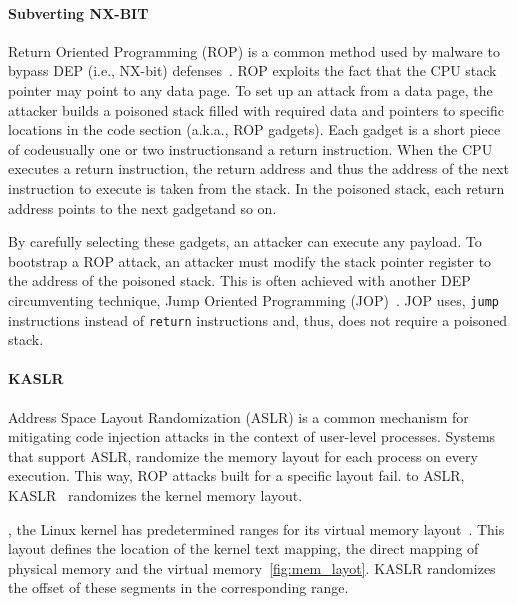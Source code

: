 \paragraph{Subverting NX-BIT}

Return Oriented Programming (ROP) is a common method used by malware to bypass DEP (i.e., NX-bit) defenses~\cite{RBSS12}. ROP exploits the fact that the CPU stack pointer may point to any data page. To set up an attack from a data page, the attacker builds a poisoned stack filled with required data and pointers to specific locations in the code section (a.k.a., ROP gadgets). Each gadget is a short piece of code\DIFdelbegin \DIFdel{(}\DIFdelend \DIFaddbegin \DIFadd{, }\DIFaddend usually one or two instructions\DIFdelbegin \DIFdel{) }\DIFdelend \DIFaddbegin \DIFadd{, }\DIFaddend and a return instruction. When the CPU executes a return instruction, the return address and thus the address of the next instruction to execute is taken from the stack. In the poisoned stack, each return address points to the next gadget\DIFaddbegin \DIFadd{, }\DIFaddend and so on. 

By carefully selecting these gadgets, an attacker can execute any payload. To bootstrap a ROP attack, an attacker must modify the stack pointer register to the address of the poisoned stack. This is often achieved with another DEP circumventing technique, \DIFdelbegin {}\DIFdelend \DIFaddbegin {}\DIFaddend Jump Oriented Programming (JOP)~\cite{BJFL11}. JOP uses, \texttt{jump} instructions instead of \texttt{return} instructions and, thus, does not require a poisoned stack.

\paragraph{KASLR}\label{sec:kaslr}

Address Space Layout Randomization (ASLR) is a common mechanism for mitigating code injection attacks in the context of user-level processes. Systems that support ASLR, randomize the memory layout for each process on every execution. This way, ROP attacks built for a specific layout fail. \DIFdelbegin {}\DIFdelend \DIFaddbegin {}\DIFaddend to ASLR, KASLR~\cite{kalsr} randomizes the kernel memory layout.

\DIFdelbegin {}\DIFdelend \DIFaddbegin {}\DIFaddend , the Linux kernel has predetermined ranges for its virtual memory layout~\cite{mem_layout}. This layout defines the location of the kernel text mapping, \DIFaddbegin {}\DIFaddend the direct mapping of physical memory and the virtual memory\DIFaddbegin {}\DIFaddend ~\ref{fig:mem_layot}. \DIFaddbegin {}\DIFaddend KASLR randomizes the offset of these segments in the corresponding range\DIFdelbegin {}\DIFdelend .

